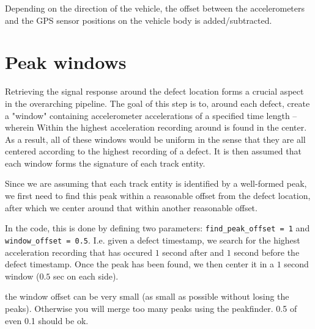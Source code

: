 Depending on the direction of the vehicle, the offset between the accelerometers and the GPS sensor positions on the vehicle body is added/subtracted.

\section{Peak windows}
Retrieving the signal response around the defect location forms a crucial aspect in the overarching pipeline. The goal of this step is to, around each defect, create a "window" containing accelerometer accelerations of a specified time length -- wherein Within the highest acceleration recording around is found in the center. As a result, all of these windows would be uniform in the sense that they are all centered according to the highest recording of a defect. It is then assumed that each window forms the signature of each track entity. 

Since we are assuming that each track entity is identified by a well-formed peak, we first need to find this peak within a reasonable offset from the defect location, after which we center around that within another reasonable offset. 

In the code, this is done by defining two parameters: \verb|find_peak_offset = 1| and \verb|window_offset = 0.5|. I.e. given a defect timestamp, we search for the highest acceleration recording that has occured $1$ second after and $1$ second before the defect timestamp. Once the peak has been found, we then center it in a $1$ second window ($0.5$ sec on each side).

the window offset can be very small (as small as possible without losing the peaks). Otherwise you will merge too many peaks using the peakfinder. 0.5 of even 0.1 should be ok. 

